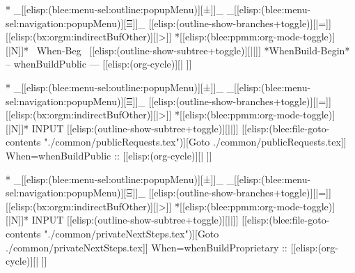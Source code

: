 \begin{whenOrg}
*  _[[elisp:(blee:menu-sel:outline:popupMenu)][±]]_ _[[elisp:(blee:menu-sel:navigation:popupMenu)][Ξ]]_ [[elisp:(outline-show-branches+toggle)][|=]] [[elisp:(bx:orgm:indirectBufOther)][|>]] *[[elisp:(blee:ppmm:org-mode-toggle)][|N]]*  ~When-Beg~   [[elisp:(outline-show-subtree+toggle)][||]] *WhenBuild-Begin* -- whenBuildPublic ---   [[elisp:(org-cycle)][| ]]

\end{whenOrg}
\begin{whenBuildPublic}



\end{whenBuildPublic}

\begin{whenOrg}
*  _[[elisp:(blee:menu-sel:outline:popupMenu)][±]]_ _[[elisp:(blee:menu-sel:navigation:popupMenu)][Ξ]]_ [[elisp:(outline-show-branches+toggle)][|=]] [[elisp:(bx:orgm:indirectBufOther)][|>]] *[[elisp:(blee:ppmm:org-mode-toggle)][|N]]*  INPUT      [[elisp:(outline-show-subtree+toggle)][||]]   [[elisp:(blee:file-goto-contents "./common/publicRequests.tex")][Goto ./common/publicRequests.tex]] When=whenBuildPublic ::  [[elisp:(org-cycle)][| ]]
\end{whenOrg}
\begin{whenBuildPublic}

\end{whenBuildPublic}



\begin{whenOrg}
*  _[[elisp:(blee:menu-sel:outline:popupMenu)][±]]_ _[[elisp:(blee:menu-sel:navigation:popupMenu)][Ξ]]_ [[elisp:(outline-show-branches+toggle)][|=]] [[elisp:(bx:orgm:indirectBufOther)][|>]] *[[elisp:(blee:ppmm:org-mode-toggle)][|N]]*  INPUT      [[elisp:(outline-show-subtree+toggle)][||]]   [[elisp:(blee:file-goto-contents "./common/privateNextSteps.tex")][Goto ./common/privateNextSteps.tex]] When=whenBuildProprietary ::  [[elisp:(org-cycle)][| ]]
\end{whenOrg}
\begin{whenBuildProprietary}

\end{whenBuildProprietary}

